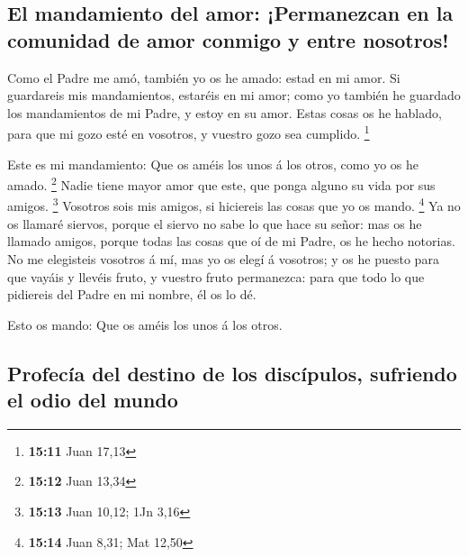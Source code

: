 \hypertarget{el-mandamiento-del-amor-permanezcan-en-la-comunidad-de-amor-conmigo-y-entre-nosotros}{%
\subsection{El mandamiento del amor: ¡Permanezcan en la comunidad de
amor conmigo y entre
nosotros!}\label{el-mandamiento-del-amor-permanezcan-en-la-comunidad-de-amor-conmigo-y-entre-nosotros}}

 Como el Padre me amó, también yo os he amado: estad en mi
amor.  Si guardareis mis mandamientos, estaréis en mi amor;
como yo también he guardado los mandamientos de mi Padre, y estoy en su
amor.  Estas cosas os he hablado, para que mi gozo esté en
vosotros, y vuestro gozo sea cumplido. \footnote{\textbf{15:11} Juan
  17,13}

 Este es mi mandamiento: Que os améis los unos á los otros,
como yo os he amado. \footnote{\textbf{15:12} Juan 13,34} 
Nadie tiene mayor amor que este, que ponga alguno su vida por sus
amigos. \footnote{\textbf{15:13} Juan 10,12; 1Jn 3,16} 
Vosotros sois mis amigos, si hiciereis las cosas que yo os mando.
\footnote{\textbf{15:14} Juan 8,31; Mat 12,50}  Ya no os
llamaré siervos, porque el siervo no sabe lo que hace su señor: mas os
he llamado amigos, porque todas las cosas que oí de mi Padre, os he
hecho notorias.  No me elegisteis vosotros á mí, mas yo os
elegí á vosotros; y os he puesto para que vayáis y llevéis fruto, y
vuestro fruto permanezca: para que todo lo que pidiereis del Padre en mi
nombre, él os lo dé.

 Esto os mando: Que os améis los unos á los otros.

\hypertarget{profecuxeda-del-destino-de-los-discuxedpulos-sufriendo-el-odio-del-mundo}{%
\subsection{Profecía del destino de los discípulos, sufriendo el odio
del
mundo}\label{profecuxeda-del-destino-de-los-discuxedpulos-sufriendo-el-odio-del-mundo}}

